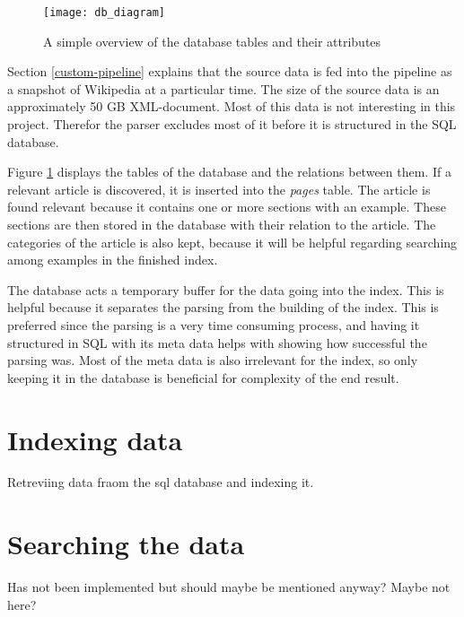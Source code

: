 \begin{figure}[h] 
\caption{A simple overview of the database tables and their attributes}
\texttt{[image: db\_diagram]}
\label{fig:db_diagram}
\end{figure}


Section \ref{custom-pipeline} explains that the source data is fed into the pipeline as a snapshot of Wikipedia at a particular time. The size of the source data is an approximately 50 GB XML-document. Most of this data is not interesting in this project. Therefor the parser excludes most of it before it is structured in the SQL database. 

Figure \ref{fig:db_diagram} displays the tables of the database and the relations between them. If a relevant article is discovered, it is inserted into the \textit{pages} table. The article is found relevant because it contains one or more sections with an example. These sections are then stored in the database with their relation to the article. The categories of the article is also kept, because it will be helpful regarding searching among examples in the finished index.  

The database acts a temporary buffer for the data going into the index. This is helpful because it separates the parsing from the building of the index. This is preferred since the parsing is a very time consuming process, and having it structured in SQL with its meta data helps with showing how successful the parsing was. Most of the meta data is also irrelevant for the index, so only keeping it in the database is beneficial for complexity of the end result.


\section{Indexing data}

Retreviing data fraom the sql database and indexing it.

\section{Searching the data}

Has not been implemented but should maybe be mentioned anyway? Maybe not here?


\cleardoublepage